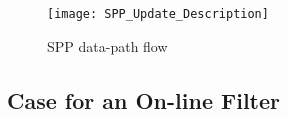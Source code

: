 \begin{figure}
  \begin{center}
  \texttt{[image: SPP\_Update\_Description]}
  \label{fig:spp_update}
  \caption{SPP data-path flow}
  \end{center}
\end{figure}



\subsection{Case for an On-line Filter}
\label{Background-Case}


